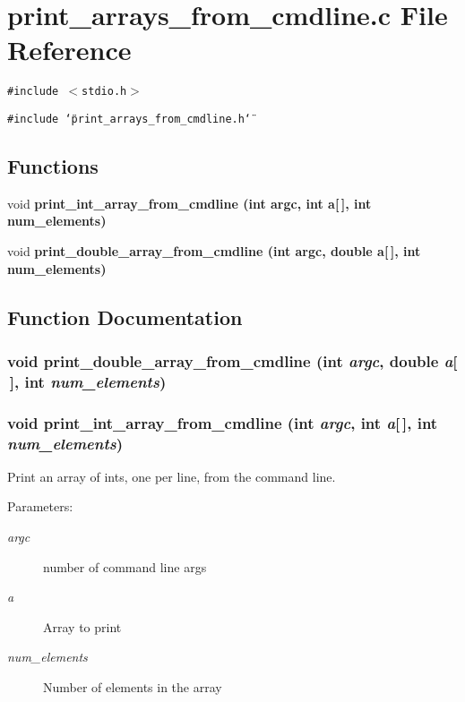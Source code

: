 \section{print\_\-arrays\_\-from\_\-cmdline.c File Reference}
\label{print__arrays__from__cmdline_8c}
{\tt \#include $<$stdio.h$>$}\par
{\tt \#include \char`\"{}print\_\-arrays\_\-from\_\-cmdline.h\char`\"{}}\par
\subsection*{Functions}
\begin{CompactItemize}
\item 
void \bf{print\_\-int\_\-array\_\-from\_\-cmdline} (int argc, int a[$\,$], int num\_\-elements)
\item 
void \bf{print\_\-double\_\-array\_\-from\_\-cmdline} (int argc, double a[$\,$], int num\_\-elements)
\end{CompactItemize}


\subsection{Function Documentation}
\subsubsection{\setlength{\rightskip}{0pt plus 5cm}void print\_\-double\_\-array\_\-from\_\-cmdline (int {\em argc}, double {\em a}[$\,$], int {\em num\_\-elements})}\label{print__arrays__from__cmdline_8c_c82c5dd7ec9555828a3d640a93e950a2}


\subsubsection{\setlength{\rightskip}{0pt plus 5cm}void print\_\-int\_\-array\_\-from\_\-cmdline (int {\em argc}, int {\em a}[$\,$], int {\em num\_\-elements})}\label{print__arrays__from__cmdline_8c_175da8a95ab4b818bcb6fcf4230bb646}


Print an array of ints, one per line, from the command line. \begin{Desc}
\item[Parameters:]
\begin{description}
\item[{\em argc}]number of command line args \item[{\em a}]Array to print \item[{\em num\_\-elements}]Number of elements in the array \end{description}
\end{Desc}
